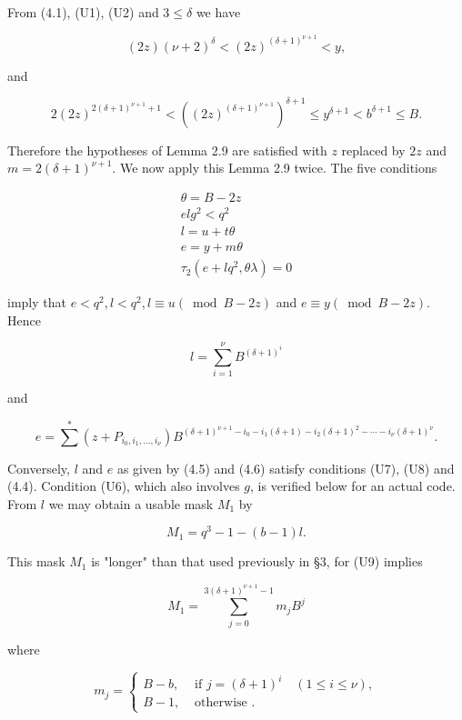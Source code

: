 \documentclass[11pt,a4paper]{article}
\newcommand{\origpage}[1]{\marginnote{\footnotesize\textbf{[#1]}}}
\begin{document}
From (4.1), (U1), (U2) and $3 \leq \delta$ we have

\[
(2 z)(\nu+2)^{\delta}<(2 z)^{(\delta+1)^{\nu+1}}<y,
\]

and

\[
2(2 z)^{2(\delta+1)^{\nu+1}+1}<\left((2 z)^{(\delta+1)^{\nu+1}}\right)^{\delta+1} \leq y^{\delta+1}<b^{\delta+1} \leq B .
\]

\origpage{565}Therefore the hypotheses of Lemma 2.9 are satisfied with $z$ replaced by $2 z$ and $m=2(\delta+1)^{\nu+1}$. We now apply this Lemma 2.9 twice. The five conditions


\begin{gather*}
\theta=B-2 z  \tag{U5}\\
e l g^{2}<q^{2}  \tag{U6}\\
l=u+t \theta  \tag{U7}\\
e=y+m\theta  \tag{U8}\\
\tau_{2}\left(e+l q^{2}, \theta \lambda\right)=0 \tag{4.4}
\end{gather*}


imply that $e<q^{2},\allowbreak  l<q^{2},\allowbreak  l \equiv u(\bmod B-2 z)$ and $e \equiv y(\bmod B-2 z)$. Hence


\begin{equation*}
l=\sum_{i=1}^{\nu} B^{(\delta+1)^{i}} \tag{4.5}
\end{equation*}


and


\begin{equation*}
e=\sum^{*}\left(z+P_{i_{0}, i_{1}, \ldots, i_{\nu}}\right) B^{(\delta+1)^{\nu+1}-i_{0}-i_{1}(\delta+1)-i_{2}(\delta+1)^{2}-\cdots-i_{\nu}(\delta+1)^{\nu}} . \tag{4.6}
\end{equation*}


Conversely, $l$ and $e$ as given by (4.5) and (4.6) satisfy conditions (U7), (U8) and (4.4). Condition (U6), which also involves $g$, is verified below for an actual code. From $l$ we may obtain a usable mask $M_{1}$ by


\begin{equation*}
M_{1}=q^{3}-1-(b-1) l . \tag{U9}
\end{equation*}


This mask $M_{1}$ is "longer" than that used previously in §3, for (U9) implies

\[
M_{1}=\sum_{j=0}^{3(\delta+1)^{\nu+1}-1} m_{j} B^{j}
\]

where

\[
m_{j}= \begin{cases}B-b, & \text { if } j=(\delta+1)^{i} \quad(1\leq i\leq\nu), \\ B-1, & \text { otherwise } .\end{cases}
\]
\end{document}
